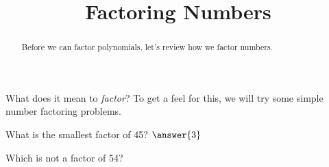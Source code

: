 \documentclass{ximera}
\title{Factoring Numbers}
\begin{document}
\begin{abstract}
Before we can factor polynomials, let's review how we factor numbers.
\end{abstract}
\maketitle


What does it mean to \emph{factor}?  To get a feel for this, we will try some simple number factoring problems.

\begin{problem}
What is the smallest factor of 45?  $\answer{3}$
\end{problem}


Which is not a factor of 54?  
\begin{multipleChoice}
\end{multipleChoice}
\end{document}
